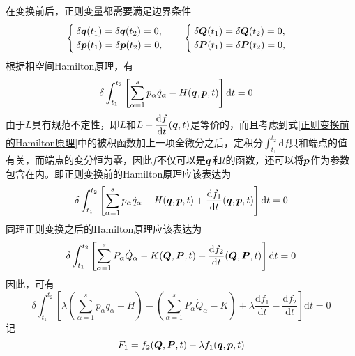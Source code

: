 在变换前后，正则变量都需要满足边界条件
\begin{align}
	\begin{cases}
		\delta\boldsymbol{q}(t_1) = \delta \boldsymbol{q}(t_2) = 0, \\
		\delta\boldsymbol{p}(t_1) = \delta \boldsymbol{p}(t_2) = 0,
	\end{cases}\quad 
	\begin{cases}
		\delta\boldsymbol{Q}(t_1) = \delta \boldsymbol{Q}(t_2) = 0, \\
		\delta\boldsymbol{P}(t_1) = \delta \boldsymbol{P}(t_2) = 0,
	\end{cases}
\end{align}
根据相空间Hamilton原理，有
\begin{align}
	& \delta \int_{t_1}^{t_2} \left[\sum_{\alpha=1}^s p_\alpha \dot{q}_\alpha - H(\mbf{q},\mbf{p},t)\right] \mathrm{d} t = 0 \label{正则变换前的Hamilton原理} %
\end{align}
由于$L$具有规范不定性，即$L$和$L+\dfrac{\mathrm{d} f}{\mathrm{d} t}(\boldsymbol{q},t)$是等价的，而且考虑到式\eqref{正则变换前的Hamilton原理}中的被积函数加上一项全微分之后，定积分$\displaystyle \int_{t_1}^{t_2} \mathrm{d} f$只和端点的值有关，而端点的变分恒为零，因此$f$不仅可以是$\boldsymbol{q}$和$t$的函数，还可以将$\boldsymbol{p}$作为参数包含在内。即正则变换前的Hamilton原理应该表达为
\begin{equation}
	\delta \int_{t_1}^{t_2} \left[\sum_{\alpha=1}^s p_\alpha \dot{q}_\alpha - H(\boldsymbol{q},\boldsymbol{p},t) + \frac{\mathrm{d} f_1}{\mathrm{d} t}(\boldsymbol{q},\boldsymbol{p},t)\right] \mathrm{d} t = 0 \label{正则变换前的Hamilton原理一般形式}
\end{equation}
同理正则变换之后的Hamilton原理应该表达为
\begin{equation}
	\delta \int_{t_1}^{t_2} \left[\sum_{\alpha=1}^s P_\alpha \dot{Q}_\alpha - K(\boldsymbol{Q},\boldsymbol{P},t) + \frac{\mathrm{d} f_2}{\mathrm{d} t}(\boldsymbol{Q},\boldsymbol{P},t)\right] \mathrm{d} t = 0 \label{正则变换后的Hamilton原理一般形式}
\end{equation}
因此，可有
\begin{equation}
	\delta \int_{t_1}^{t_2} \left[\lambda \left(\sum_{\alpha=1}^s p_\alpha \dot{q}_\alpha - H\right) - \left(\sum_{\alpha=1}^s P_\alpha \dot{Q}_\alpha - K\right) + \lambda \frac{\mathrm{d} f_1}{\mathrm{d} t} - \frac{\mathrm{d} f_2}{\mathrm{d} t}\right] \mathrm{d} t = 0
\end{equation}
记
\begin{equation}
	F_1 = f_2(\boldsymbol{Q},\boldsymbol{P},t) - \lambda f_1(\boldsymbol{q},\boldsymbol{p},t)
\end{equation}
